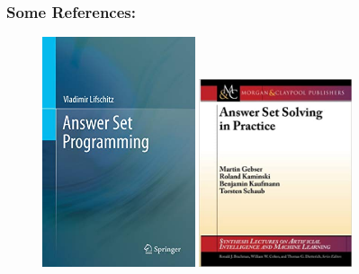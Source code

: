 \documentclass{beamer}
\begin{document}
\begin{frame}
	\frametitle{Some References:}
	
\begin{figure}[tbp]
  \centering
	 \includegraphics[width=0.4\textwidth , height=0.55\textheight]{cover_book_vladmir.jpg}
	 \includegraphics[width=0.4\textwidth , height=0.55\textheight]{cover_book_roland.jpg}
	
	\end{figure}
\end{frame}

\end{document}
